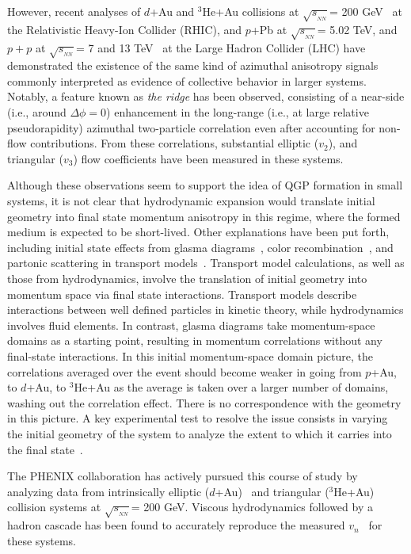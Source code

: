 \documentclass[%
reprint,
showpacs,preprintnumbers,
 amsmath,amssymb,
 aps,
]{revtex4-1}
\newcommand{\sqsn}{\mbox{$\sqrt{s_{_{NN}}}$}\xspace}
\newcommand{\dau}{\mbox{$d$+Au}\xspace}
\newcommand{\pau}{\mbox{$p$+Au}\xspace}
\newcommand{\hau}{\mbox{$^3\text{He}$+Au}\xspace}
\newcommand{\ppb}{\mbox{$p$+Pb}\xspace}
\begin{document}
However, recent analyses of \dau and \hau collisions at \sqsn = 200 GeV~\cite{Adare:2015ctn,PhysRevLett.111.212301,Adamczyk:2014fcx,PhysRevLett.115.142301} at the Relativistic Heavy-Ion Collider (RHIC), and \ppb at \sqsn = 5.02 TeV, and $p+p$ at \sqsn = 7 and 13 TeV~\cite{alice_long_2013,atlas_observation_2012,cms_observation_2012,Khachatryan:2015lva,Aad:2015gqa,Khachatryan:2010gv,Khachatryan:2016txc} at the Large Hadron Collider (LHC) have demonstrated the existence of the same kind of azimuthal anisotropy signals commonly interpreted as evidence of collective behavior in larger systems. Notably, a feature known as \textit{the ridge} has been observed, consisting of a near-side (i.e., around $\Delta \phi = 0$) enhancement in the long-range (i.e., at large relative pseudorapidity) azimuthal two-particle correlation even after accounting for non-flow contributions. From these correlations, substantial elliptic ($v_2$), and triangular ($v_3$) flow coefficients have been measured in these systems.

Although these observations seem to support the idea of QGP formation in small systems, it is not clear that hydrodynamic expansion would translate initial geometry into final state momentum anisotropy in this regime, where the formed medium is expected to be short-lived. Other explanations have been put forth, including initial state effects from glasma diagrams~\cite{dusling_azimuthal_2012}, color recombination~\cite{Ortiz:2013yxa}, and partonic scattering in transport models~\cite{bzdak_elliptic_2014,ma_long-range_2014,Koop:2015wea}. Transport model calculations, as well as those from hydrodynamics, involve the translation of initial geometry into momentum space via final state interactions. Transport models describe interactions between well defined particles in kinetic theory, while hydrodynamics involves fluid elements. In contrast, glasma diagrams take momentum-space domains as a starting point, resulting in momentum correlations without any final-state interactions. In this initial momentum-space domain picture, the correlations averaged over the event should become weaker in going from \pau, to \dau, to \hau as the average is taken over a larger number of domains, washing out the correlation effect. There is no correspondence with the geometry in this picture. A key experimental test to resolve the issue consists in varying the initial geometry of the system to analyze the extent to which it carries into the final state~\cite{nagle_exploiting_2013}.

The PHENIX collaboration has actively pursued this course of study by analyzing data from intrinsically elliptic (\dau)~\cite{Adare:2015ctn,PhysRevLett.111.212301} and triangular (\hau)~\cite{Adare:2015ctn} collision systems at \sqsn = 200 GeV. Viscous hydrodynamics followed by a hadron cascade has been found to accurately reproduce the measured $v_n$~\cite{Romatschke:2015gxa,adare_measurement_2014,PhysRevLett.111.212301,Adare:2015ctn,Bozek:2015qpa} for these systems.
\end{document}
